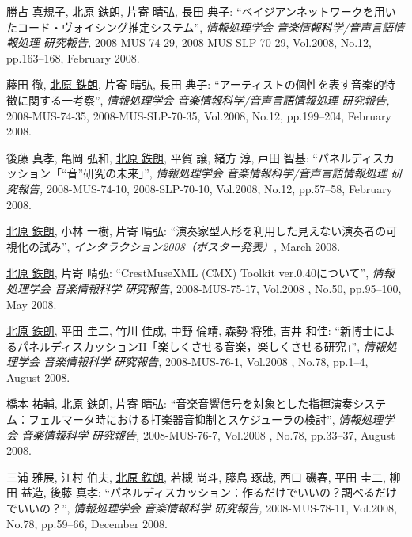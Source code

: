 \begin{Enumerate}
\item 
勝占 真規子, 
\underline{北原 鉄朗}, 
片寄 晴弘, 
長田 典子: 
    ``ベイジアンネットワークを用いたコード・ヴォイシング推定システム'', 
    {\it 情報処理学会 音楽情報科学/音声言語情報処理 研究報告,
    } 2008-MUS-74-29, 2008-MUS-SLP-70-29, Vol.2008, No.12, pp.163--168, February 2008. 

\item 
藤田 徹, 
\underline{北原 鉄朗}, 
片寄 晴弘, 
長田 典子: 
    ``アーティストの個性を表す音楽的特徴に関する一考察'', 
    {\it 情報処理学会 音楽情報科学/音声言語情報処理 研究報告,
    } 2008-MUS-74-35, 2008-MUS-SLP-70-35, Vol.2008, No.12, pp.199--204, February 2008. 

\item 
後藤
      真孝, 
亀岡 弘和, 
\underline{北原 鉄朗}, 
平賀 譲, 
緒方 淳, 
戸田 智基: 
    ``パネルディスカッション「``音''研究の未来」'', 
    {\it 情報処理学会 音楽情報科学/音声言語情報処理 研究報告,
    } 2008-MUS-74-10, 2008-SLP-70-10, Vol.2008, No.12, pp.57--58, February 2008. 

\item 
\underline{北原 鉄朗}, 
小林 一樹, 
片寄 晴弘: 
    ``演奏家型人形を利用した見えない演奏者の可視化の試み'', 
    {\it インタラクション2008（ポスター発表）,
    } March 2008. 

\item 
\underline{北原 鉄朗}, 
片寄 晴弘: 
    ``CrestMuseXML (CMX) Toolkit ver.0.40について'', 
    {\it 情報処理学会 音楽情報科学 研究報告,} 2008-MUS-75-17, Vol.2008 , No.50, pp.95--100, May 2008. 

\item 
\underline{北原 鉄朗}, 
平田 圭二, 
竹川 佳成, 
中野 倫靖, 
森勢 将雅, 
吉井 和佳: 
    ``新博士によるパネルディスカッションII「楽しくさせる音楽，楽しくさせる研究」'', 
    {\it 情報処理学会 音楽情報科学 研究報告,} 2008-MUS-76-1, Vol.2008 , No.78, pp.1--4, August 2008. 

\item 
橋本 祐輔, 
\underline{北原 鉄朗}, 
片寄 晴弘: 
    ``音楽音響信号を対象とした指揮演奏システム：フェルマータ時における打楽器音抑制とスケジューラの検討'', 
    {\it 情報処理学会 音楽情報科学 研究報告,} 2008-MUS-76-7, Vol.2008 , No.78, pp.33--37, August 2008. 

\item 
三浦 雅展, 
江村 伯夫, 
\underline{北原 鉄朗}, 
若槻 尚斗, 
藤島 琢哉, 
西口 磯春, 
平田 圭二, 
柳田 益造, 
後藤 真孝: 
    ``パネルディスカッション：作るだけでいいの？調べるだけでいいの？'', 
    {\it 情報処理学会 音楽情報科学 研究報告,} 2008-MUS-78-11, Vol.2008, No.78, pp.59--66, December 2008. 


\end{Enumerate}
